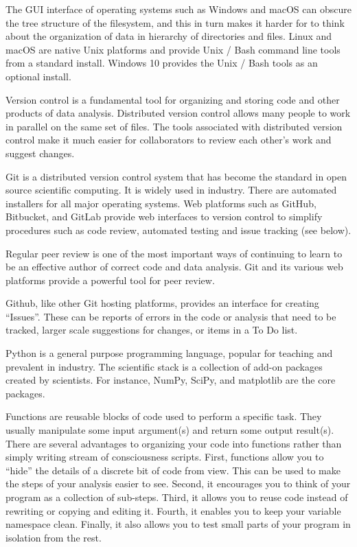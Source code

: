 The GUI interface of operating systems such as Windows and macOS can obscure
the tree structure of the filesystem, and this in turn makes it harder for
to think about the organization of data in hierarchy of
directories and files.  Linux and macOS are native Unix platforms and provide
Unix / Bash command line tools from a standard install.  Windows 10 provides
the Unix / Bash tools as an optional install.

Version control is a fundamental tool for organizing and storing code and
other products of data analysis.
Distributed version control allows many people to work in parallel on the
same set of files.
The tools associated with distributed version control make it much easier
for collaborators to review each other's work and suggest changes.

Git is a distributed version control system that has become the standard in
open source scientific computing.
It is widely used in industry.
There are automated installers for all major operating systems.
Web platforms such as GitHub, Bitbucket, and GitLab provide web interfaces
to version control to simplify procedures such as code review, automated
testing and issue tracking (see below).

Regular peer review is one of the most important ways of continuing to learn
to be an effective author of correct code and data analysis.  Git and its
various web platforms provide a powerful tool for peer review.

Github, like other Git hosting platforms, provides an interface for creating
``Issues''.  These can be reports of errors in the code or analysis that need
to be tracked, larger scale suggestions for changes, or items in a To Do list.



Python is a general purpose programming language,
popular for teaching and prevalent in industry.
The scientific stack is a collection of add-on packages created by scientists.
For instance, NumPy, SciPy, and matplotlib are the core packages.

Functions are reusable blocks of code used to perform a specific task.
They usually manipulate some input argument(s) and return some output
result(s).
There are several advantages to organizing your code into functions rather
than simply writing stream of consciousness scripts.
First, functions allow you to ``hide'' the details of a discrete bit of
code from view.
This can be used to make the steps of your analysis easier to see.
Second, it encourages you to think of your program as a collection of sub-steps.
Third, it allows you to reuse code instead of rewriting or copying and editing
it.
Fourth, it enables you to keep your variable namespace clean.
Finally, it also allows you to test small parts of your program in isolation
from the rest.

